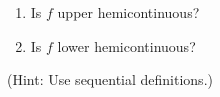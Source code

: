 \documentclass{article}
\begin{document}
\begin{enumerate}[1.]
{    \begin{enumerate}
      \item Is $f$ upper hemicontinuous?

      \item Is $f$ lower hemicontinuous?
    \end{enumerate}

    (Hint: Use sequential definitions.)
  }
\end{enumerate}

\end{document}
